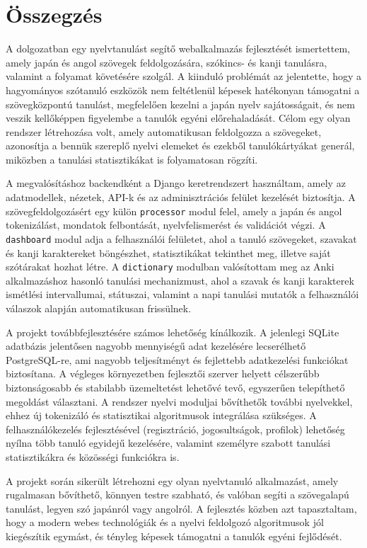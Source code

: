 \chapter{Összegzés}
\label{ch:sum}
A dolgozatban egy nyelvtanulást segítő webalkalmazás fejlesztését ismertettem, amely japán és angol szövegek feldolgozására, szókincs- és kanji tanulásra, valamint a folyamat követésére szolgál. A kiinduló problémát az jelentette, hogy a hagyományos szótanuló eszközök nem feltétlenül képesek hatékonyan támogatni a szövegközpontú tanulást, megfelelően kezelni a japán nyelv sajátosságait, és nem veszik kellőképpen figyelembe a tanulók egyéni előrehaladását. Célom egy olyan rendszer létrehozása volt, amely automatikusan feldolgozza a szövegeket, azonosítja a bennük szereplő nyelvi elemeket és ezekből tanulókártyákat generál, miközben a tanulási statisztikákat is folyamatosan rögzíti.

A megvalósításhoz backendként a Django keretrendszert használtam, amely az adatmodellek, nézetek, API-k és az adminisztrációs felület kezelését biztosítja. A szövegfeldolgozásért egy külön \texttt{processor} modul felel, amely a japán és angol tokenizálást, mondatok felbontását, nyelvfelismerést és validációt végzi. A \texttt{dashboard} modul adja a felhasználói felületet, ahol a tanuló szövegeket, szavakat és kanji karaktereket böngészhet, statisztikákat tekinthet meg, illetve saját szótárakat hozhat létre. A \texttt{dictionary} modulban valósítottam meg az Anki alkalmazáshoz hasonló tanulási mechanizmust, ahol a szavak és kanji karakterek ismétlési intervallumai, státuszai, valamint a napi tanulási mutatók a felhasználói válaszok alapján automatikusan frissülnek.

A projekt továbbfejlesztésére számos lehetőség kínálkozik. A jelenlegi SQLite adatbázis jelentősen nagyobb mennyiségű adat kezelésére lecserélhető PostgreSQL-re, ami nagyobb teljesítményt és fejlettebb adatkezelési funkciókat biztosítana. A végleges környezetben fejlesztői szerver helyett célszerűbb biztonságosabb és stabilabb üzemeltetést lehetővé tevő, egyszerűen telepíthető megoldást választani. A rendszer nyelvi moduljai bővíthetők további nyelvekkel, ehhez új tokenizáló és statisztikai algoritmusok integrálása szükséges. A felhasználókezelés fejlesztésével (regisztráció, jogosultságok, profilok) lehetőség nyílna több tanuló egyidejű kezelésére, valamint személyre szabott tanulási statisztikákra és közösségi funkciókra is.

A projekt során sikerült létrehozni egy olyan nyelvtanuló alkalmazást, amely rugalmasan bővíthető, könnyen testre szabható, és valóban segíti a szövegalapú tanulást, legyen szó japánról vagy angolról. A fejlesztés közben azt tapasztaltam, hogy a modern webes technológiák és a nyelvi feldolgozó algoritmusok jól kiegészítik egymást, és tényleg képesek támogatni a tanulók egyéni fejlődését.